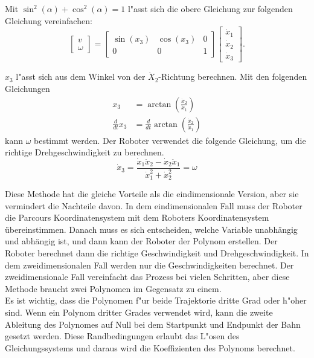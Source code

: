 Mit \(\sin^2(\alpha) + \cos^2(\alpha) = 1\) l"asst sich die obere Gleichung zur folgenden Gleichung vereinfachen:
\begin{equation}
    \begin{bmatrix*}
        v \\
        \omega
    \end{bmatrix*}
    =
    \begin{bmatrix*}
        \sin(x_3) & \cos(x_3) & 0 \\
        0 & 0 & 1
    \end{bmatrix*}
    \begin{bmatrix*}
        \dot{x}_1 \\
        \dot{x}_2 \\
        \dot{x}_3
    \end{bmatrix*}.
\end{equation}

\(x_3\) l"asst sich aus dem Winkel von der \(\dot{X}_2\)-Richtung berechnen. Mit den folgenden Gleichungen
\begin{align*}
    x_3 &= \arctan(\frac{\dot{x}_2}{\dot{x}_1}) \\
    \frac{d}{dt}x_3 &= \frac{d}{dt}\arctan(\frac{\dot{x}_2}{\dot{x}_1})
\end{align*}
kann \(\omega\) bestimmt werden. Der Roboter verwendet die folgende Gleichung, um die richtige Drehgeschwindigkeit zu berechnen.
\begin{equation}
    \dot{x}_3 = \frac{\dot{x}_1\ddot{x}_2 - \dot{x}_2\ddot{x}_1}{\dot{x}_1^2 + \dot{x}_2^2} = \omega
\end{equation}

Diese Methode hat die gleiche Vorteile als die eindimensionale Version, aber sie vermindert die Nachteile davon. In dem eindimensionalen Fall muss der Roboter die Parcours Koordinatensystem mit dem Roboters Koordinatensystem übereinstimmen. Danach muss es sich entscheiden, welche Variable unabhängig und abhängig ist, und dann kann der Roboter der Polynom erstellen. Der Roboter berechnet dann die richtige Geschwindigkeit und Drehgeschwindigkeit. In dem zweidimensionalen Fall werden nur die Geschwindigkeiten berechnet. Der zweidimensionale Fall vereinfacht das Prozess bei vielen Schritten, aber diese Methode braucht zwei Polynomen im Gegensatz zu einem. \\

Es ist wichtig, dass die Polynomen f"ur beide Trajektorie dritte Grad oder h"oher sind. Wenn ein Polynom dritter Grades verwendet wird, kann die zweite Ableitung des Polynomes auf Null bei dem Startpunkt und Endpunkt der Bahn gesetzt werden. Diese Randbedingungen erlaubt das L"osen des Gleichungssystems und daraus wird die Koeffizienten des Polynoms berechnet. 

